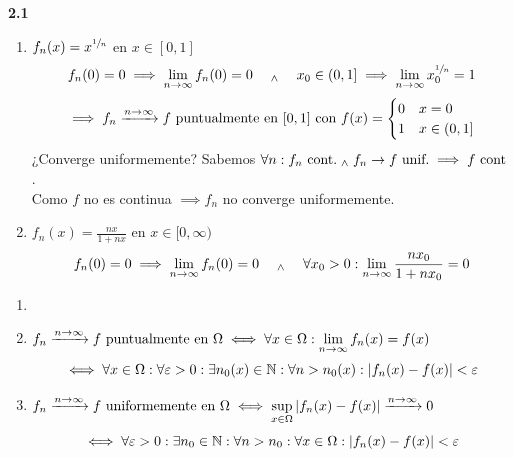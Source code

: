 \textbf{2.1}
\begin{enumerate}
	\item $f_n(x) = x^{\sfrac{1}{n}}$ en $x\in [0,1]$
	      \[f_n(0)=0 \implies \lim_{n\to \infty} f_n(0) = 0 \quad \; _{\wedge} \; \quad x_0 \in (0, 1] \implies \lim_{n\to \infty} x_0^{\sfrac{1}{n}} = 1\]
	      \[\implies f_n \xrightarrow{n\to\infty} f \text{ puntualmente en } [0, 1] \text{ con } f(x)= \begin{cases} 0 & x=0 \\ 1 & x\in (0, 1] \end{cases}\]
	      ¿Converge uniformemente? Sabemos $\forall n : f_n \text{ cont.} \; _{\wedge} \; f_n\rightarrow f \text{ unif.} \implies f \text{ cont}$. \\
	      Como $f$ no es continua $\implies f_n$ no converge uniformemente.
	\item $f_n(x) = \frac{nx}{1+nx}$ en $x\in [0,\infty)$
	      \[f_n(0)=0 \implies \lim_{n\to \infty} f_n(0) = 0 \quad \; _{\wedge} \; \quad \forall x_0 > 0 : \lim_{n\to \infty} \frac{nx_0}{1+nx_0} = 0\]

\end{enumerate}
\begin{obs}
	\begin{enumerate}
		\item[]
		\item $\displaystyle f_n \xrightarrow{n\to \infty} f \text{ puntualmente en } \Omega \iff \forall x \in \Omega : \lim_{n\to \infty} f_n(x) = f(x)$
		      \[\iff \forall x \in \Omega : \forall \varepsilon > 0 : \exists n_0(x) \in \mathbb{N} : \forall n > n_0(x) : \left|f_n(x)-f(x)\right|<\varepsilon\]
		\item $\displaystyle f_n \xrightarrow{n\to \infty} f \text{ uniformemente en }\Omega\iff \sup_{x\in \Omega} \left|f_n(x)-f(x)\right| \xrightarrow{n\to \infty} 0$
		      \[\iff \forall \varepsilon > 0 : \exists n_0 \in \mathbb{N} : \forall n > n_0 : \forall x \in \Omega : \left|f_n(x)-f(x)\right|<\varepsilon\]
	\end{enumerate}
\end{obs}

